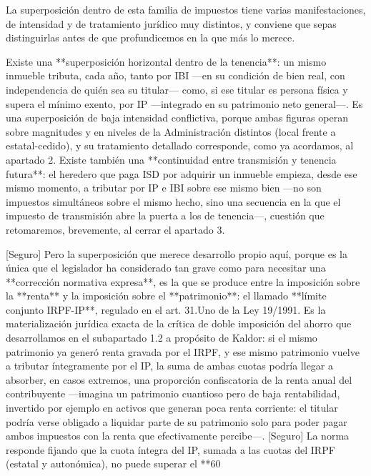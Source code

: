 \documentclass[10pt,a4paper]{article}
\begin{document}
La superposición dentro de esta familia de impuestos tiene varias manifestaciones, de intensidad y de tratamiento jurídico muy distintos, y conviene que sepas distinguirlas antes de que profundicemos en la que más lo merece.

Existe una **superposición horizontal dentro de la tenencia**: un mismo inmueble tributa, cada año, tanto por IBI —en su condición de bien real, con independencia de quién sea su titular— como, si ese titular es persona física y supera el mínimo exento, por IP —integrado en su patrimonio neto general—. Es una superposición de baja intensidad conflictiva, porque ambas figuras operan sobre magnitudes y en niveles de la Administración distintos (local frente a estatal-cedido), y su tratamiento detallado corresponde, como ya acordamos, al apartado 2. Existe también una **continuidad entre transmisión y tenencia futura**: el heredero que paga ISD por adquirir un inmueble empieza, desde ese mismo momento, a tributar por IP e IBI sobre ese mismo bien —no son impuestos simultáneos sobre el mismo hecho, sino una secuencia en la que el impuesto de transmisión abre la puerta a los de tenencia—, cuestión que retomaremos, brevemente, al cerrar el apartado 3.

[Seguro] Pero la superposición que merece desarrollo propio aquí, porque es la única que el legislador ha considerado tan grave como para necesitar una **corrección normativa expresa**, es la que se produce entre la imposición sobre la **renta** y la imposición sobre el **patrimonio**: el llamado **límite conjunto IRPF-IP**, regulado en el art. 31.Uno de la Ley 19/1991. Es la materialización jurídica exacta de la crítica de doble imposición del ahorro que desarrollamos en el subapartado 1.2 a propósito de Kaldor: si el mismo patrimonio ya generó renta gravada por el IRPF, y ese mismo patrimonio vuelve a tributar íntegramente por el IP, la suma de ambas cuotas podría llegar a absorber, en casos extremos, una proporción confiscatoria de la renta anual del contribuyente —imagina un patrimonio cuantioso pero de baja rentabilidad, invertido por ejemplo en activos que generan poca renta corriente: el titular podría verse obligado a liquidar parte de su patrimonio solo para poder pagar ambos impuestos con la renta que efectivamente percibe—. [Seguro] La norma responde fijando que la cuota íntegra del IP, sumada a las cuotas del IRPF (estatal y autonómica), no puede superar el **60%
\end{document}
